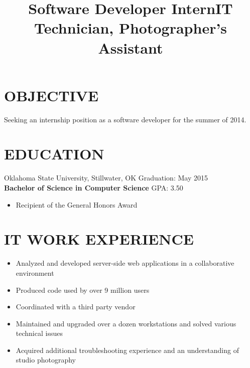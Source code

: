 \documentclass[line, overlapped]{res}
\begin{document}
\address{1875 Arbor Valley Dr \\ Edmond, OK 73025 \\ (405) 598-7827 \\ brandon@brandonsilver.com}

\begin{resume}

    \section{OBJECTIVE}
    Seeking an internship position as a software developer for the summer of 2014.

    \section{EDUCATION}
    Oklahoma State University, Stillwater, OK \hfill Graduation: May 2015 \\
    \textbf{Bachelor of Science in Computer Science} \hfill GPA: 3.50
    \begin{itemize}
        \item Recipient of the General Honors Award
    \end{itemize}

	\section{IT WORK EXPERIENCE} 

    \title{Software Developer Intern}
    \begin{position}
        \begin{itemize}
            \item Analyzed and developed server-side web applications in a collaborative environment
            \item Produced code used by over 9 million users
            \item Coordinated with a third party vendor
    \end{itemize}
    \end{position} 
 
    \title{IT Technician, Photographer's Assistant}
    \begin{position}
        \begin{itemize}
            \item Maintained and upgraded over a dozen workstations and solved various technical issues
            \item Acquired additional troubleshooting experience and an understanding of studio photography
        \end{itemize}
    \end{position}




\end{resume}
\end{document}
